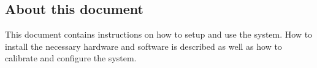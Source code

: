 
\subsection{About this document}
This document contains instructions on how to setup and use the system. How to install the necessary hardware and software is described as well as how to calibrate and configure the system.
